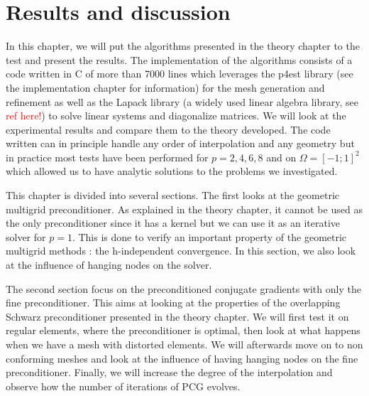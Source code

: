 \chapter{Results and discussion}
In this chapter, we will put the algorithms presented in the theory chapter to the test and present the results. The implementation of the algorithms consists of a code written in C of more than 7000 lines which leverages the p4est library (see the implementation chapter for information) for the mesh generation and refinement as well as the Lapack library (a widely used linear algebra library, see \textcolor{red}{ref here!}) to solve linear systems and diagonalize matrices. We will look at the experimental results and compare them to the theory developed. The code written can in principle handle any order of interpolation and any geometry but in practice most tests have been performed for $p=2,4,6,8$ and on $\Omega = [-1;1]^2$ which allowed us to have analytic solutions to the problems we investigated. 

This chapter is divided into several sections. The first looks at the geometric multigrid preconditioner. As explained in the theory chapter, it cannot be used as the only preconditioner since it has a kernel but we can use it as an iterative solver for $p=1$. This is done to verify an important property of the geometric multigrid methods : the h-independent convergence. In this section, we also look at the influence of hanging nodes on the solver.

The second section focus on the preconditioned conjugate gradients with only the fine preconditioner. This aims at looking at the properties of the overlapping Schwarz preconditioner presented in the theory chapter. We will first test it on regular elements, where the preconditioner is optimal, then look at what happens when we have a mesh with distorted elements. We will afterwards move on to non conforming meshes and look at the influence of having hanging nodes on the fine preconditioner. Finally, we will increase the degree of the interpolation and observe how the number of iterations of PCG evolves. 

